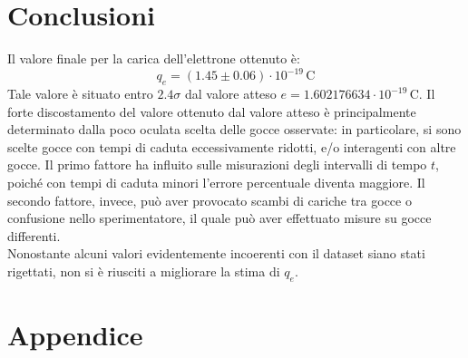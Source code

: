 \documentclass[]{article}
\let\oldsection\section%
\renewcommand{\section}{%
	\renewcommand{\theequation}{\thesection.\arabic{equation}}%
	\oldsection}%
\begin{document}
    \section{Conclusioni}
    Il valore finale per la carica dell'elettrone ottenuto è:
    \begin{equation}
        q_e = \left( 1.45 \pm 0.06 \right) \cdot 10^{-19} \, \text{C}
    \end{equation}
    Tale valore è situato entro $2.4\sigma$ dal valore atteso $e = 1.602176634 \cdot 10^{-19} \, \text{C}$. Il forte discostamento del valore ottenuto dal valore atteso è principalmente determinato dalla poco oculata scelta delle gocce osservate: in particolare, si sono scelte gocce con tempi di caduta eccessivamente ridotti, e/o interagenti con altre gocce. Il primo fattore ha influito sulle misurazioni degli intervalli di tempo $t$, poiché con tempi di caduta minori l'errore percentuale diventa maggiore. Il secondo fattore, invece, può aver provocato scambi di cariche tra gocce o confusione nello sperimentatore, il quale può aver effettuato misure su gocce differenti. \\
    Nonostante alcuni valori evidentemente incoerenti con il dataset siano stati rigettati, non si è riusciti a migliorare la stima di $q_e$.
    
    \newpage

    \section*{Appendice}
\end{document}
